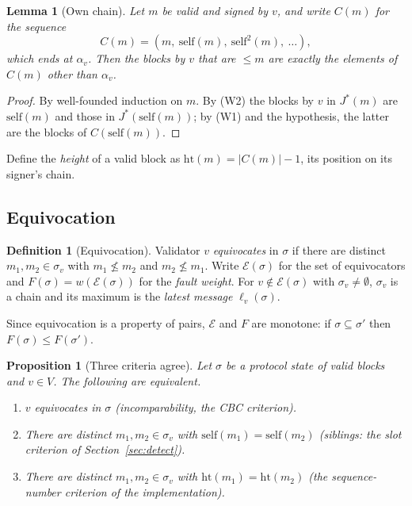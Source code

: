 \documentclass[11pt]{article}
\newtheorem{lemma}[theorem]{Lemma}
\newtheorem{proposition}[theorem]{Proposition}
\theoremstyle{definition}
\newtheorem{definition}[theorem]{Definition}
\theoremstyle{remark}
\newcommand{\Jst}{J^{*}}
\newcommand{\slf}{\mathrm{self}}
\newcommand{\Eq}{\mathcal{E}}
\newcommand{\hgt}{\mathrm{ht}}
\begin{document}
\begin{lemma}[Own chain]\label{lem:chain}
Let $m$ be valid and signed by $v$, and write $C(m)$ for the sequence
\[C(m)=(m,\ \slf(m),\ \slf^2(m),\ \dots),\]
which ends at $\alpha_v$. Then the blocks by $v$
that are $\le m$ are exactly the elements of $C(m)$ other than $\alpha_v$.
\end{lemma}

\begin{proof}
By well-founded induction on $m$. By (W2) the blocks by $v$ in $\Jst(m)$ are
$\slf(m)$ and those in $\Jst(\slf(m))$; by (W1) and the hypothesis,
the latter are the blocks of $C(\slf(m))$.
\end{proof}

Define the \emph{height} of a valid block as $\hgt(m)=|C(m)|-1$, its position on
its signer's chain.

\subsection{Equivocation}

\begin{definition}[Equivocation]\label{def:equiv}
Validator $v$ \emph{equivocates} in $\sigma$ if there are distinct
$m_1,m_2\in\sigma_v$ with $m_1\not\le m_2$ and $m_2\not\le m_1$. Write
$\Eq(\sigma)$ for the set of equivocators and $F(\sigma)=w(\Eq(\sigma))$ for
the \emph{fault weight}. For $v\notin\Eq(\sigma)$ with $\sigma_v\ne\emptyset$,
$\sigma_v$ is a chain and its maximum is the \emph{latest message}
$\ell_v(\sigma)$.
\end{definition}

Since equivocation is a property of pairs, $\Eq$ and $F$ are monotone: if
$\sigma\subseteq\sigma'$ then $F(\sigma)\le F(\sigma')$.

\begin{proposition}[Three criteria agree]\label{prop:three}
Let $\sigma$ be a protocol state of valid blocks and $v\in V$. The following
are equivalent.
\begin{enumerate}[label=(\alph*)]
\item $v$ equivocates in $\sigma$ (incomparability, the CBC criterion).
\item There are distinct $m_1,m_2\in\sigma_v$ with $\slf(m_1)=\slf(m_2)$
  (siblings: the slot criterion of Section~\ref{sec:detect}).
\item There are distinct $m_1,m_2\in\sigma_v$ with $\hgt(m_1)=\hgt(m_2)$
  (the sequence-number criterion of the implementation).
\end{enumerate}
\end{proposition}
\end{document}
